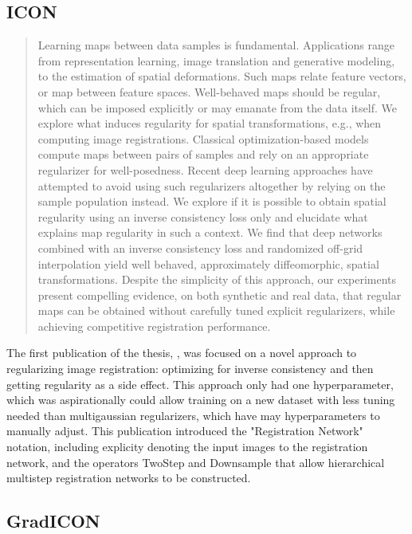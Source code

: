 \documentclass{article}
\begin{document}
\subsection{ICON}
\begin{abstract}
    
  Learning maps between data samples is fundamental. Applications range from representation learning, image translation and generative modeling, to the estimation of spatial deformations. Such maps relate feature vectors, or map between feature spaces. Well-behaved maps should be regular, which can be imposed explicitly or may emanate from the data itself. We explore what induces regularity for spatial transformations, e.g., when computing image registrations. Classical optimization-based models compute maps between pairs of samples and rely on an appropriate regularizer for well-posedness. Recent deep learning approaches have attempted to avoid using such regularizers altogether by relying on the sample population instead. We explore if it is possible to obtain spatial regularity using an inverse consistency loss only and elucidate what explains map regularity in such a context. We find that deep networks combined with an inverse consistency loss and randomized off-grid interpolation yield well behaved, approximately diffeomorphic, spatial transformations. Despite the simplicity of this approach, our experiments present compelling evidence, on both synthetic and real data, that regular maps can be obtained without carefully tuned explicit regularizers, while achieving competitive registration performance.%
\end{abstract}
The first publication of the thesis, \cite{greer2021icon}, was focused on a novel approach to regularizing image registration: optimizing for inverse consistency and then getting regularity as a side effect. This approach only had one hyperparameter, which was aspirationally could allow training on a new dataset with less tuning needed than multigaussian regularizers, which have may hyperparameters to manually adjust. This publication introduced the "Registration Network" notation, including explicity denoting the input images to the registration network, and the operators TwoStep and Downsample that allow hierarchical multistep registration networks to be constructed.
\subsection{GradICON}
\end{document}
